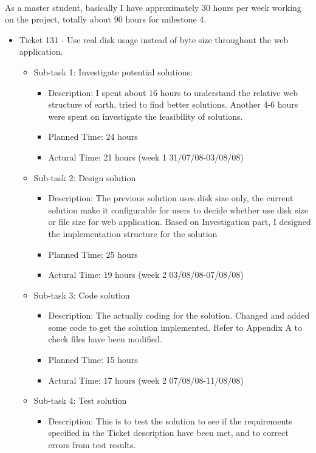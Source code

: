 \documentclass[10pt,a4,oneside]{article}
\begin{document}
\paragraph{}
As a master student, basically I have approximately 30 hours per week working on the project, totally about 90 hours for milestone 4.
\begin{itemize}
 \item Ticket 131 - Use real disk usage instead of byte size throughout the web application.
	\begin{itemize}
	\item Sub-task 1: Investigate potential solutions:
			\begin{itemize}
			\item Description: I spent about 16 hours to understand the relative web structure of earth, tried to find better solutions. Another 4-6 hours were spent on investigate the feasibility of solutions.
			\item Planned Time: 24 hours
			\item Actural Time: 21 hours (week 1 31/07/08-03/08/08)
			\end{itemize}
		\item Sub-task 2: Design solution
			\begin{itemize}
			\item Description: The previous solution uses disk size only, the current solution make it configurable for users to decide whether use disk size or file size for web application. Based on Investigation part, I designed the implementation structure for the solution
			\item Planned Time: 25 hours
			\item Actural Time: 19 hours (week 2 03/08/08-07/08/08)
			\end{itemize}
		\item Sub-task 3: Code solution
			\begin{itemize}
			\item Description: The actually coding for the solution. Changed and added some code to get the solution implemented. Refer to Appendix A to check files have been modified.
			\item Planned Time: 15 hours
			\item Actural Time: 17 hours (week 2 07/08/08-11/08/08)
			\end{itemize}
 		\item Sub-task 4: Test solution
			\begin{itemize}
			\item Description: This is to test the solution to see if the requirements specified in the Ticket description have been met, and to correct errors from test results.

\end{itemize}
\end{itemize}
\end{itemize}
\end{document}
